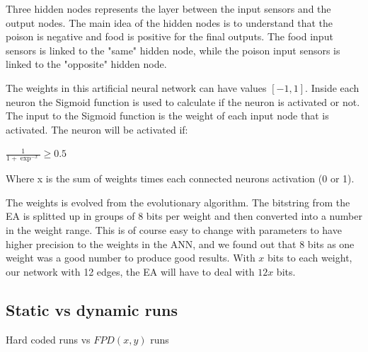 Three hidden nodes represents the layer between the input sensors and the output nodes. The main idea of the hidden nodes is to understand that the poison is negative and food is positive for the final outputs. The food input sensors is linked to the "same" hidden node, while the poison input sensors is linked to the "opposite" hidden node. 

The weights in this artificial neural network can have values $[-1, 1]$. Inside each neuron the Sigmoid function is used to calculate if the neuron is activated or not. The input to the Sigmoid function is the weight of each input node that is activated. The neuron will be activated if:

\begin{center}
	$\frac{1}{1 + \exp^{-x}} \geq 0.5$
\end{center}

Where x is the sum of weights times each connected neurons activation (0 or 1).

The weights is evolved from the evolutionary algorithm. The bitstring from the EA is splitted up in groups of 8 bits per weight and then converted into a number in the weight range. This is of course easy to change with parameters to have higher precision to the weights in the ANN, and we found out that 8 bits as one weight was a good number to produce good results. With $x$ bits to each weight, our network with 12 edges, the EA will have to deal with $12x$ bits.

\subsection{Static vs dynamic runs}
Hard coded runs vs $FPD(x, y)$ runs

